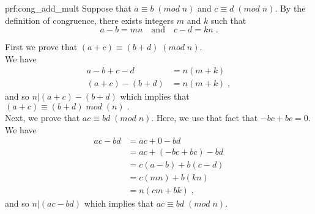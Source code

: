 \begin{prf}{prf:cong_add_mult} %
Suppose that $a \equiv b\;(mod\;n)$ and $c \equiv d \;(mod\;n)$\;. By the definition of congruence, there exists integers $m$ and $k$ such that 
$$a-b = mn \quad \text{and} \quad c-d = kn\;.$$

\noindent First we prove that  $(a+c) \equiv (b+d) \;(mod\;n)$\;.\\

We have
\begin{align*}
    a-b+c-d &= n(m+k) \\
    (a+c) - (b+d) &= n(m+k)\;,
\end{align*}
and so $n \vert (a+c) - (b+d)$ which implies that     $(a+c) \equiv (b+d)\; mod\;(n)\;.$ \\

\noindent Next, we prove that $ac \equiv bd \;(mod\;n)$\;. Here, we use that fact that $-bc + bc = 0.$\\

We have
\begin{align*}
    ac - bd &= ac + 0 -bd \\
    &= ac + (-bc + bc) - bd \\
    &= c(a-b) + b(c-d) \\
    &=c(mn) + b(kn) \\
    &=n(cm + bk)\;, 
\end{align*}
and so $n \vert (ac-bd)$ which implies that $ac \equiv bd \;(mod\;n)$\;.

\end{prf}

